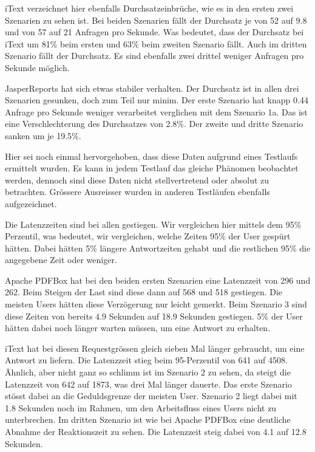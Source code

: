 \documentclass[main.tex]{subfiles}
\begin{document}
iText verzeichnet hier ebenfalls Durchsatzeinbrüche, wie es in den ersten zwei Szenarien zu sehen ist. Bei beiden Szenarien fällt der Durchsatz je von 52 auf 9.8 und von 57 auf 21 Anfragen pro Sekunde. Was bedeutet, dass der Durchsatz bei iText um 81\% beim ersten und 63\% beim zweiten Szenario fällt.
Auch im dritten Szenario fällt der Durchsatz. Es sind ebenfalls zwei drittel weniger Anfragen pro Sekunde möglich. 

JasperReports hat sich etwas stabiler verhalten. Der Durchsatz ist in allen drei Szenarien gesunken, doch zum Teil nur minim. Der erste Szenario hat knapp 0.44 Anfrage pro Sekunde weniger verarbeitet verglichen mit dem Szenario 1a. Das ist eine Verschlechterung des Durchsatzes von 2.8\%. Der zweite und dritte Szenario sanken um je 19.5\%.  

Hier sei noch einmal hervorgehoben, dass diese Daten aufgrund eines Testlaufs ermittelt wurden. Es kann in jedem Testlauf das gleiche Phänomen beobachtet werden, dennoch sind diese Daten nicht stellvertretend oder absolut zu betrachten. Grössere Ausreisser wurden in anderen Testläufen ebenfalls aufgezeichnet.

Die Latenzzeiten sind bei allen gestiegen. Wir vergleichen hier mittels dem 95\% Perzentil, was bedeutet, wir vergleichen, welche Zeiten 95\% der User gespürt hätten. Dabei hätten 5\% längere Antwortzeiten gehabt und die restlichen 95\% die angegebene Zeit oder weniger.

Apache PDFBox hat bei den beiden ersten Szenarien eine Latenzzeit von 296 und 262. Beim Steigen der Last sind diese dann auf 568 und 518 gestiegen. Die meisten Users hätten diese Verzögerung nur leicht gemerkt. Beim Szenario 3 sind diese Zeiten von bereits 4.9 Sekunden auf 18.9 Sekunden gestiegen. 5\% der User hätten dabei noch länger warten müssen, um eine Antwort zu erhalten. 

iText hat bei diesen Requestgrössen gleich sieben Mal länger gebraucht, um eine Antwort zu liefern. Die Latenzzeit stieg beim 95-Perzentil von 641 auf 4508. Ähnlich, aber nicht ganz so schlimm ist im Szenario 2 zu sehen, da steigt die Latenzzeit von 642 auf 1873, was drei Mal länger dauerte. Das erste Szenario stösst dabei an die Geduldsgrenze der meisten User.  Szenario 2 liegt dabei mit 1.8 Sekunden noch im Rahmen, um den Arbeitsfluss eines Users nicht zu unterbrechen. Im dritten Szenario ist wie bei Apache PDFBox eine deutliche Abnahme der Reaktionszeit zu sehen. Die Latenzzeit steig dabei von 4.1 auf 12.8 Sekunden. 
\end{document}
